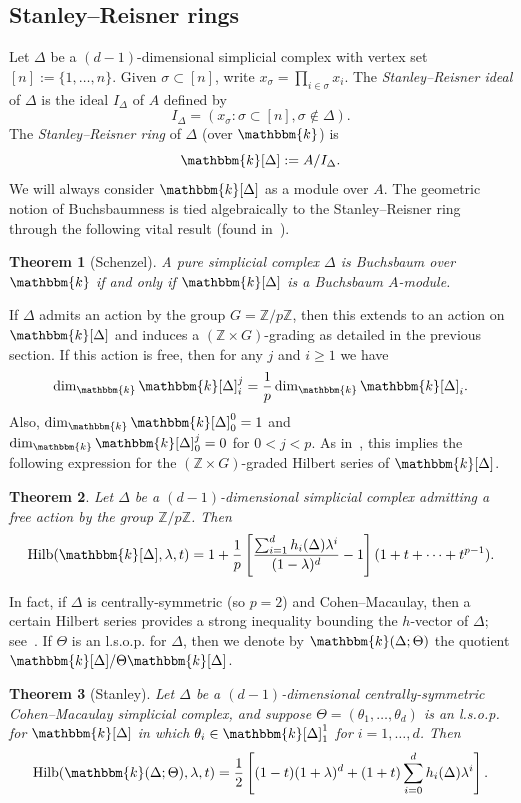 \documentclass[10pt]{amsart}
\newtheorem{theo}{Theorem}[section]
\theoremstyle{definition}
\DeclareMathOperator{\Hilb}{Hilb}
\newcommand{\field}{\mathbbm{k}}
\newcommand{\ZZ}{{\mathbb Z}}
\begin{document}
\subsection{Stanley--Reisner rings}

Let $\Delta$ be a $(d-1)$-dimensional simplicial complex with vertex set $[n]:=\{1, \ldots, n\}$. Given $\sigma\subset [n]$, write $x_\sigma=\prod_{i\in \sigma}x_i$. The \emph{Stanley--Reisner ideal} of $\Delta$ is the ideal $I_\Delta$ of $A$ defined by
\[
I_\Delta=(x_\sigma:\sigma\subset [n], \sigma\not\in\Delta).
\]
The \emph{Stanley--Reisner ring} of $\Delta$ (over $\field$) is
\[
\field[\Delta]:= A/I_\Delta.
\]
We will always consider $\field[\Delta]$ as a module over $A$. The geometric notion of Buchsbaumness is tied algebraically to the Stanley--Reisner ring through the following vital result (found in~\cite{Schenzel}).

\begin{theo}[Schenzel]A pure simplicial complex $\Delta$ is Buchsbaum over $\field$ if and only if $\field[\Delta]$ is a Buchsbaum $A$-module.
\end{theo}

If $\Delta$ admits an action by the group $G=\ZZ/p\ZZ$, then this extends to an action on $\field[\Delta]$ and induces a $(\ZZ\times G)$-grading as detailed in the previous section. If this action is free, then for any $j$ and $i\ge 1$ we have
\[
\dim_\field \field[\Delta]_i^j=\frac{1}{p}\dim_\field \field[\Delta]_i.
\]
Also, $\dim_\field \field[\Delta]_0^0=1$ and $\dim_\field \field[\Delta]_0^j=0$ for $0<j<p$. As in~\cite[Section~3]{St-87}, this implies the following expression for the $(\ZZ\times G)$-graded Hilbert series of $\field[\Delta]$.

\begin{theo}\label{SRHilb}
Let $\Delta$ be a $(d-1)$-dimensional simplicial complex admitting a free action by the group $\ZZ/p\ZZ$. Then
\[
\Hilb(\field[\Delta], \lambda, t)=1+\frac{1}{p}\left[\frac{\sum_{i=1}^d h_i(\Delta)\lambda^i}{(1-\lambda)^d}-1\right](1+t+\cdots+t^{p-1}).
\]
\end{theo}

In fact, if $\Delta$ is centrally-symmetric (so $p=2$) and Cohen--Macaulay, then a certain Hilbert series provides a strong inequality bounding the $h$-vector of $\Delta$; see~\cite[Theorem~III.8.1]{St-96}. If $\Theta$ is an l.s.o.p. for $\Delta$, then we denote by $\field(\Delta; \Theta)$ the quotient $\field[\Delta]/\Theta\field[\Delta]$.

\begin{theo}[Stanley]
Let $\Delta$ be a $(d-1)$-dimensional centrally-symmetric Cohen--Macaulay simplicial complex, and suppose $\Theta=(\theta_1, \ldots, \theta_d)$ is an l.s.o.p. for $\field[\Delta]$ in which $\theta_i\in\field[\Delta]_1^1$ for $i=1, \ldots, d$. Then
\[
\Hilb(\field(\Delta; \Theta), \lambda, t)=\frac{1}{2}\left[(1-t)(1+\lambda)^d+(1+t)\sum_{i=0}^dh_i(\Delta)\lambda^i\right].
\]
\end{theo}
\end{document}
